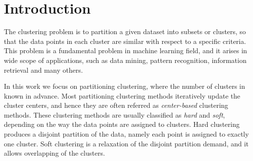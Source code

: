 \documentclass[12pt]{article}
\numberwithin{equation}{section}
\begin{document}
%
%
%
%
%
%
%
%
%
%
%
%
%
%
%
%
%
%
%
%
%

\tableofcontents

\clearpage

\section{Introduction}

The clustering problem is to partition a given dataset into subsets or clusters, so that the data points in each cluster are similar with respect to a specific criteria. This problem is a fundamental problem in machine learning field, and it arises in wide scope of applications, such as data mining, pattern recognition, information retrieval and many others. 

In this work we focus on partitioning clustering, where the number of clusters in known in advance. Most partitioning clustering methods iteratively update the cluster centers, and hence they are often referred as \textit{center-based} clustering methods. These clustering methods are usually classified as \textit{hard} and \textit{soft}, depending on the way the data points are assigned to clusters. Hard clustering produces a disjoint partition of the data, namely each point is assigned to exactly one cluster. Soft clustering is a relaxation of the disjoint partition demand, and it allows overlapping of the clusters.
\end{document}

